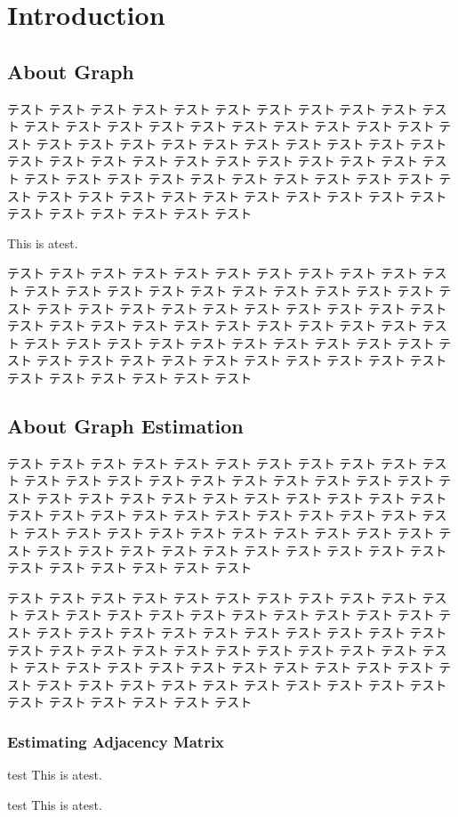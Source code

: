 
\chapter{Introduction}
\section{About Graph}
テスト テスト テスト テスト テスト テスト テスト テスト テスト テスト テスト テスト テスト テスト 
テスト テスト テスト テスト テスト テスト テスト テスト テスト テスト テスト テスト テスト テスト 
テスト テスト テスト テスト テスト テスト テスト テスト テスト テスト テスト テスト テスト テスト 
テスト テスト テスト テスト テスト テスト テスト テスト テスト テスト テスト テスト テスト テスト 
テスト テスト テスト テスト テスト テスト テスト テスト テスト テスト テスト テスト テスト テスト 

\noindent This is a\hfill test.

テスト テスト テスト テスト テスト テスト テスト テスト テスト テスト テスト テスト テスト テスト 
テスト テスト テスト テスト テスト テスト テスト テスト テスト テスト テスト テスト テスト テスト 
テスト テスト テスト テスト テスト テスト テスト テスト テスト テスト テスト テスト テスト テスト 
テスト テスト テスト テスト テスト テスト テスト テスト テスト テスト テスト テスト テスト テスト 
テスト テスト テスト テスト テスト テスト テスト テスト テスト テスト テスト テスト テスト テスト 

\newpage
\section{About Graph Estimation}
テスト テスト テスト テスト テスト テスト テスト テスト テスト テスト テスト テスト テスト テスト 
テスト テスト テスト テスト テスト テスト テスト テスト テスト テスト テスト テスト テスト テスト 
テスト テスト テスト テスト テスト テスト テスト テスト テスト テスト テスト テスト テスト テスト 
テスト テスト テスト テスト テスト テスト テスト テスト テスト テスト テスト テスト テスト テスト 
テスト テスト テスト テスト テスト テスト テスト テスト テスト テスト テスト テスト テスト テスト 

テスト テスト テスト テスト テスト テスト テスト テスト テスト テスト テスト テスト テスト テスト 
テスト テスト テスト テスト テスト テスト テスト テスト テスト テスト テスト テスト テスト テスト 
テスト テスト テスト テスト テスト テスト テスト テスト テスト テスト テスト テスト テスト テスト 
テスト テスト テスト テスト テスト テスト テスト テスト テスト テスト テスト テスト テスト テスト 
テスト テスト テスト テスト テスト テスト テスト テスト テスト テスト テスト テスト テスト テスト 

\newpage
\subsection{Estimating Adjacency Matrix}
test
\noindent This is a\hfill test.

\newpage
test
\noindent This is a\hfill test.

